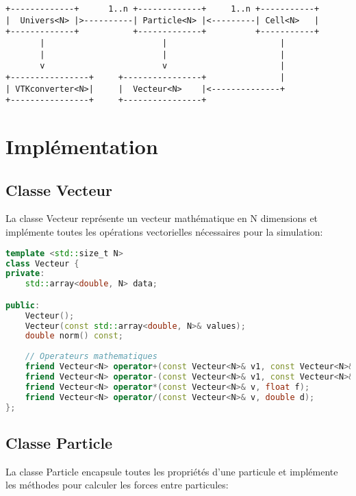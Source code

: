 \documentclass[12pt,a4paper]{article}
\begin{document}
\begin{verbatim}
+-------------+      1..n +-------------+     1..n +-----------+
|  Univers<N> |>----------| Particle<N> |<---------| Cell<N>   |
+-------------+           +-------------+          +-----------+
       |                        |                       |
       |                        |                       |
       v                        v                       |
+----------------+     +----------------+               |
| VTKconverter<N>|     |  Vecteur<N>    |<--------------+
+----------------+     +----------------+
\end{verbatim}

\section{Implémentation}

\subsection{Classe Vecteur}

La classe Vecteur représente un vecteur mathématique en N dimensions et implémente toutes les opérations vectorielles nécessaires pour la simulation:

\begin{lstlisting}[language=C++, caption=Extrait de la classe Vecteur]
template <std::size_t N>
class Vecteur {
private:
    std::array<double, N> data;

public:
    Vecteur();
    Vecteur(const std::array<double, N>& values);
    double norm() const;
    
    // Operateurs mathematiques
    friend Vecteur<N> operator+(const Vecteur<N>& v1, const Vecteur<N>& v2);
    friend Vecteur<N> operator-(const Vecteur<N>& v1, const Vecteur<N>& v2);
    friend Vecteur<N> operator*(const Vecteur<N>& v, float f);
    friend Vecteur<N> operator/(const Vecteur<N>& v, double d);
};
\end{lstlisting}

\subsection{Classe Particle}

La classe Particle encapsule toutes les propriétés d'une particule et implémente les méthodes pour calculer les forces entre particules:
\end{document}

